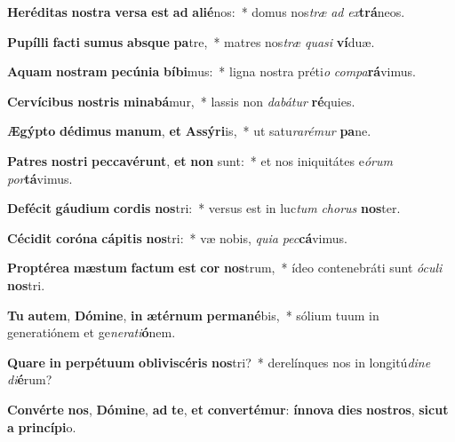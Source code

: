 \item \textbf{He}\textbf{ré}\textbf{di}\textbf{tas} \textbf{nos}\textbf{tra} \textbf{ver}\textbf{sa} \textbf{est} \textbf{ad} \textbf{a}\textbf{li}\textbf{é}nos:~* domus nos\textit{træ} \textit{ad} \textit{ex}\textbf{trá}neos.
\item \textbf{Pu}\textbf{píl}\textbf{li} \textbf{fac}\textbf{ti} \textbf{su}\textbf{mus} \textbf{abs}\textbf{que} \textbf{pa}tre,~* matres nos\textit{træ} \textit{qua}\textit{si} \textbf{ví}duæ.
\item \textbf{A}\textbf{quam} \textbf{nos}\textbf{tram} \textbf{pe}\textbf{cú}\textbf{ni}\textbf{a} \textbf{bí}\textbf{bi}mus:~* ligna nostra préti\textit{o} \textit{com}\textit{pa}\textbf{rá}vimus.
\item \textbf{Cer}\textbf{ví}\textbf{ci}\textbf{bus} \textbf{nos}\textbf{tris} \textbf{mi}\textbf{na}\textbf{bá}mur,~* lassis non \textit{da}\textit{bá}\textit{tur} \textbf{ré}quies.
\item \textbf{Æ}\textbf{gýp}\textbf{to} \textbf{dé}\textbf{di}\textbf{mus} \textbf{ma}\textbf{num}, \textbf{et} \textbf{As}\textbf{sý}\textbf{ri}is,~* ut satu\textit{ra}\textit{ré}\textit{mur} \textbf{pa}ne.
\item \textbf{Pa}\textbf{tres} \textbf{nos}\textbf{tri} \textbf{pec}\textbf{ca}\textbf{vé}\textbf{runt}, \textbf{et} \textbf{non} sunt:~* et nos iniquitátes e\textit{ó}\textit{rum} \textit{por}\textbf{tá}vimus.
\item \textbf{De}\textbf{fé}\textbf{cit} \textbf{gáu}\textbf{di}\textbf{um} \textbf{cor}\textbf{dis} \textbf{nos}tri:~* versus est in luc\textit{tum} \textit{cho}\textit{rus} \textbf{nos}ter.
\item \textbf{Cé}\textbf{ci}\textbf{dit} \textbf{co}\textbf{ró}\textbf{na} \textbf{cá}\textbf{pi}\textbf{tis} \textbf{nos}tri:~* væ nobis, \textit{qui}\textit{a} \textit{pec}\textbf{cá}vimus.
\item \textbf{Prop}\textbf{tér}\textbf{e}\textbf{a} \textbf{mæs}\textbf{tum} \textbf{fac}\textbf{tum} \textbf{est} \textbf{cor} \textbf{nos}trum,~* ídeo contenebráti sunt \textit{ó}\textit{cu}\textit{li} \textbf{nos}tri.
\item \textbf{Tu} \textbf{au}\textbf{tem}, \textbf{Dó}\textbf{mi}\textbf{ne}, \textbf{in} \textbf{æ}\textbf{tér}\textbf{num} \textbf{per}\textbf{ma}\textbf{né}bis,~* sólium tuum in generatiónem et ge\textit{ne}\textit{ra}\textit{ti}\textbf{ó}nem.
\item \textbf{Qua}\textbf{re} \textbf{in} \textbf{per}\textbf{pé}\textbf{tu}\textbf{um} \textbf{ob}\textbf{li}\textbf{vi}\textbf{scé}\textbf{ris} \textbf{nos}tri?~* derelínques nos in longitú\textit{di}\textit{ne} \textit{di}\textbf{é}rum?
\item \textbf{Con}\textbf{vér}\textbf{te} \textbf{nos}, \textbf{Dó}\textbf{mi}\textbf{ne}, \textbf{ad} \textbf{te}, \textbf{et} \textbf{con}\textbf{ver}\textbf{té}\textbf{mur}: \textbf{ín}\textbf{no}\textbf{va} \textbf{di}\textbf{es} \textbf{nos}\textbf{tros}, \textbf{sic}\textbf{ut} \textbf{a} \textbf{prin}\textbf{cí}\textbf{pi}o.
